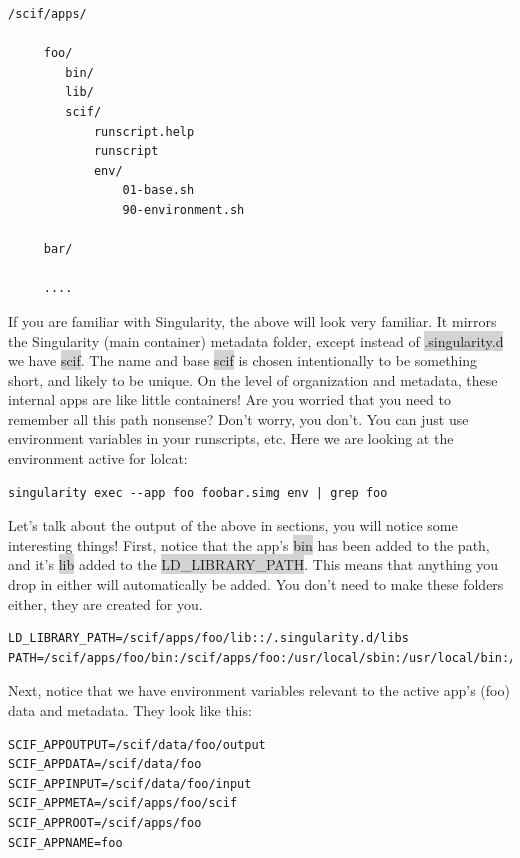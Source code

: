 \documentclass[a4paper]{article}
\begin{document}
\begin{lstlisting}[frame=single] 
/scif/apps/

     foo/
        bin/
        lib/
        scif/
            runscript.help
            runscript
            env/
                01-base.sh 
                90-environment.sh

     bar/

     ....
\end{lstlisting}	
			
		If you are familiar with Singularity, the above will look very familiar. It mirrors the Singularity (main container) metadata folder, except instead of \colorbox{lightgray}{.singularity.d} we have \colorbox{lightgray}{scif}. The name and base \colorbox{lightgray}{scif} is chosen intentionally to be something short, and likely to be unique. On the level of organization and metadata, these internal apps are like little containers! Are you worried that you need to remember all this path nonsense? Don’t worry, you don’t. You can just use environment variables in your runscripts, etc. Here we are looking at the environment active for lolcat:
		
\begin{lstlisting}[frame=single]  
singularity exec --app foo foobar.simg env | grep foo

\end{lstlisting}		
		
		Let’s talk about the output of the above in sections, you will notice some interesting things! First, notice that the app’s \colorbox{lightgray}{bin} has been added to the path, and it’s \colorbox{lightgray}{lib} added to the \colorbox{lightgray}{LD\_LIBRARY\_PATH}. This means that anything you drop in either will automatically be added. You don’t need to make these folders either, they are created for you.
		
\begin{lstlisting}[frame=single]  
LD_LIBRARY_PATH=/scif/apps/foo/lib::/.singularity.d/libs
PATH=/scif/apps/foo/bin:/scif/apps/foo:/usr/local/sbin:/usr/local/bin:/usr/sbin:/usr/bin:/sbin:/bin
\end{lstlisting}
Next, notice that we have environment variables relevant to the active app’s (foo) data and metadata. They look like this:
\begin{lstlisting}[frame=single]  
SCIF_APPOUTPUT=/scif/data/foo/output
SCIF_APPDATA=/scif/data/foo
SCIF_APPINPUT=/scif/data/foo/input
SCIF_APPMETA=/scif/apps/foo/scif
SCIF_APPROOT=/scif/apps/foo
SCIF_APPNAME=foo
\end{lstlisting}
\end{document}
